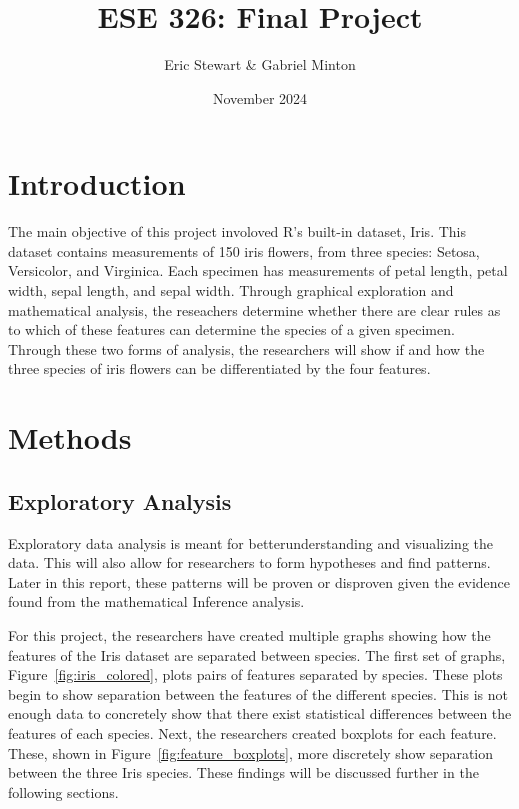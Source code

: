\documentclass{article}
\title{ESE 326: Final Project}
\author{Eric Stewart \& Gabriel Minton}
\date{November 2024}
\begin{document}
\maketitle
\tableofcontents

\newpage

\section{Introduction}
The main objective of this project involoved R's built-in dataset, Iris. This dataset contains measurements of 150 iris flowers, from three species: Setosa, Versicolor, and Virginica. Each specimen has measurements of petal length, petal width, sepal length, and sepal width. Through
graphical exploration and mathematical analysis, the reseachers determine whether
there are clear rules as to which of these features can determine the species of a
given specimen. Through these two forms of analysis, the researchers will show if and how the three species of iris flowers can be differentiated by the four features.


\section{Methods}

\subsection{Exploratory Analysis}

Exploratory data analysis is meant for betterunderstanding and visualizing the data. This will also allow for researchers to form hypotheses and find patterns. Later in this report, these patterns will be proven or disproven given the evidence found from the mathematical Inference analysis.

For this project, the researchers have created multiple graphs showing how the features of the Iris dataset are separated between species. The first set of graphs, Figure~\ref{fig:iris_colored}, plots pairs of features separated by species. These plots begin to show separation between the features of the different species. This is not enough data to concretely show that there exist statistical differences between the features of each species. Next, the researchers created boxplots for each feature. These, shown in Figure~\ref{fig:feature_boxplots}, more discretely show separation between the three Iris species. These findings will be discussed further in the following sections.
\end{document}

